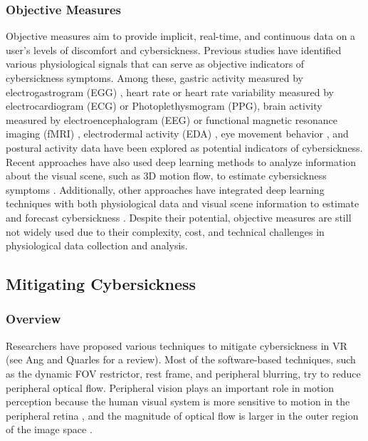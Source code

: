 \subsubsection{Objective Measures}
Objective measures aim to provide implicit, real-time, and continuous data on a user's levels of discomfort and cybersickness.  
Previous studies have identified various physiological signals that can serve as objective indicators of cybersickness symptoms. 
Among these, gastric activity measured by electrogastrogram (EGG) \cite{dennison_use_2016}, 
heart rate or heart rate variability measured by electrocardiogram (ECG) or Photoplethysmogram (PPG), 
brain activity measured by electroencephalogram (EEG) or functional magnetic resonance imaging (fMRI) \cite{tian_who_2024, mimnaugh_virtual_2023}, %
electrodermal activity (EDA) \cite{dennison_use_2016},   
eye movement behavior \cite{lopes_2020},  
and postural activity data 
\cite{stoffregen_postural_1998}
have been explored as potential indicators of cybersickness.
Recent approaches have also used deep learning methods to analyze information about the visual scene, such as 3D motion flow, to estimate cybersickness symptoms \cite{zhao_2023}. 
Additionally, other approaches have integrated deep learning techniques with both physiological data and visual scene information to estimate and forecast cybersickness \cite{islam_cybersickness_2021}.
Despite their potential, objective measures are still not widely used due to their complexity, cost, and technical challenges in physiological data collection and analysis.


\subsection{Mitigating Cybersickness}
\subsubsection{Overview}
Researchers have proposed various techniques to mitigate cybersickness in VR (see Ang and Quarles \cite{ang_reduction_2023} for a review).
Most of the software-based techniques, such as the dynamic FOV restrictor, rest frame, and peripheral blurring, try to reduce peripheral optical flow.
Peripheral vision plays an important role in motion perception because the human visual system is more sensitive to motion in the peripheral retina \cite{stoffregen_flow_1985, lishman_vision_1981}, and the magnitude of optical flow is larger in the outer region of the image space \cite{gibson_parallax_1955}.

